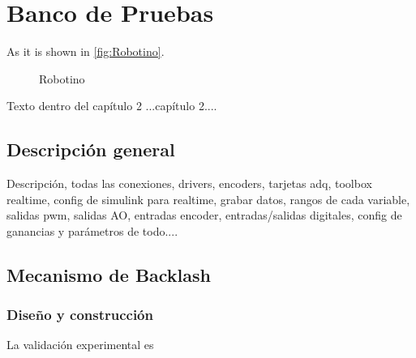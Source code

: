\cleardoublepage %
\chapter{Banco de Pruebas}
As it is shown in \autoref{fig:Robotino}.
\begin{figure}[h]
    \centering
    \caption{Robotino}
    \label{fig:Robotino}
\end{figure}


Texto dentro del capítulo 2 ...cap\'itulo 2....


\section{Descripci\'on general}
Descripci\'on, todas las conexiones, drivers, encoders, tarjetas adq, toolbox realtime, config de simulink para realtime, grabar datos, rangos de cada variable, salidas pwm, salidas AO, entradas encoder, entradas/salidas digitales, config de ganancias y par\'ametros de todo....

\section{Mecanismo de Backlash}

\subsection{Dise\~no y construcci\'on}
La validación experimental es

